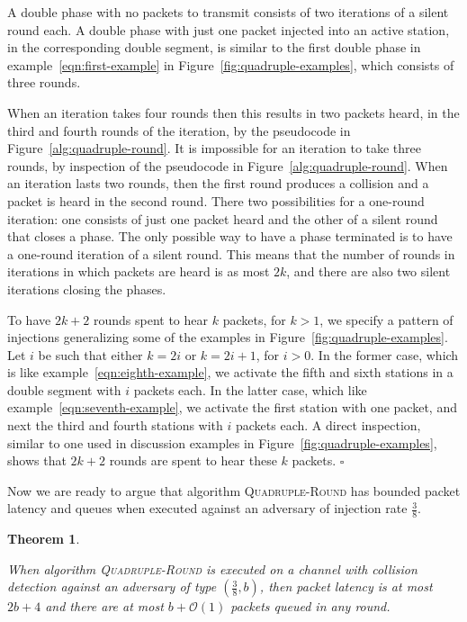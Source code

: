 \documentclass[11pt]{article}
\newcommand{\cO}{{\mathcal O}}
\newcommand{\qed}{\hfill $\square$ \smallbreak}
\newenvironment{proof}{\noindent{\bf Proof:}}{\qed}
\newtheorem{theorem}{Theorem}
\begin{document}
\begin{proof}
A double phase with no packets to transmit consists of two iterations of a silent round each.
A double phase with just one packet injected into an active station, in the corresponding double segment, is similar to the first double phase in example~\eqref{eqn:first-example} in Figure~\ref{fig:quadruple-examples}, which consists of three rounds.

When an iteration takes four rounds then this results in two packets heard, in the third and fourth rounds of the iteration, by the pseudocode in Figure~\ref{alg:quadruple-round}.
It is impossible for an iteration to take three rounds, by inspection of the pseudocode in Figure~\ref{alg:quadruple-round}.
When an iteration lasts two rounds, then the first round produces a collision and a packet is heard in the second round.
There two possibilities for a one-round iteration: one consists of just one packet heard and the other 
 of a silent round that closes a phase. 
The only possible way to have a phase terminated is to have a one-round iteration of a silent round.
This means that the number of rounds in iterations in which packets are heard is as most $2k$, and there are also two silent iterations closing the phases.

To have $2k+2$ rounds  spent to hear $k$ packets, for $k>1$, we  specify a pattern of injections generalizing some of the examples in Figure~\ref{fig:quadruple-examples}.
Let $i$ be such that either $k=2i$ or $k=2i+1$, for $i>0$.
In the former case, which is like example~\ref{eqn:eighth-example}, we activate the fifth and sixth stations in a double segment with $i$ packets each.
In the latter case, which like example~\ref{eqn:seventh-example}, we activate the first station with one packet, and next the third and fourth stations with  $i$ packets each.
A direct inspection, similar to one used in discussion examples in Figure~\ref{fig:quadruple-examples}, shows that $2k+2$ rounds are spent to hear these $k$ packets.
\end{proof}


Now we are ready to argue that algorithm \textsc{Quadruple-Round} has bounded packet latency and queues when executed against an adversary of injection rate $\frac{3}{8}$.




\begin{theorem}
\label{thm:quadruple-round}

When algorithm \textsc{Quadruple-Round} is executed on a channel with collision detection against an adversary of type $(\frac{3}{8},b)$, then packet latency is at most $2b +4$ and there are at most $b + \cO(1)$ packets queued in any round.
\end{theorem}
\end{document}
